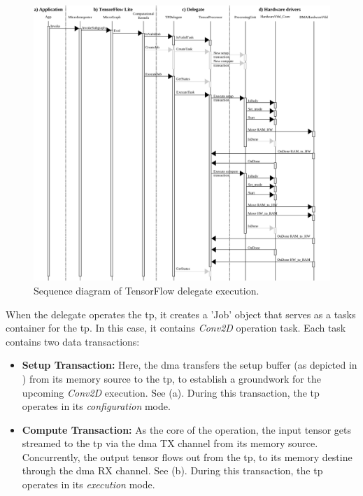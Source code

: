 \begin{figure}[h!]
	\centering
	\includegraphics[width=\textwidth]{./figures/sequence_tfl_delegate_acceleration.pdf}
	\caption{Sequence diagram of TensorFlow delegate execution.}
	\label{fig:sw_tf_delegate_execution}
\end{figure}

When the delegate operates the \gls{tp}, it creates a 'Job' object that serves as a tasks container for the \gls{tp}. In this case, it contains \textit{Conv2D} operation task. Each task contains two data transactions:

\begin{itemize}
	\item \textbf{Setup Transaction:} Here, the \gls{dma} transfers the setup buffer (as depicted in ) from its memory source to the \gls{tp}, to establish a groundwork for the upcoming \textit{Conv2D} execution. See  (a). During this transaction, the \gls{tp} operates in its \textit{configuration} mode.
	\item \textbf{Compute Transaction:} As the core of the operation, the input tensor gets streamed to the \gls{tp} via the \gls{dma} TX channel from its memory source. Concurrently, the output tensor flows out from the \gls{tp}, to its memory destine through the \gls{dma} RX channel. See  (b). During this transaction, the \gls{tp} operates in its \textit{execution} mode.
\end{itemize}

